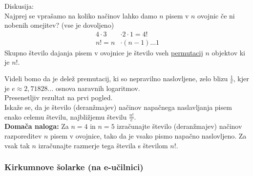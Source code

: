 \noindent
Diskusija: \\
Najprej se vprašamo na koliko načinov lahko damo $n$ pisem v $n$ ovojnic če ni nobenih omejitev? (vse je dovoljeno)
\begin{align*}
    4 \cdot 3 &\cdot 2 \cdot 1 = 4! \\
    n! = n &\cdot (n - 1) \dots 1
\end{align*}
Skupno število dajanja pisem v ovojnice je število vseh \underline{permutacij} $n$ objektov ki je $n!$.
\begin{center}
\end{center}
Videli bomo da je delež premutacij, ki so nepravilno naslovljene, zelo blizu $\frac{1}{e}$, kjer je $e \approx 2,71828\dots$ osnova naravnih logaritmov. \\

\noindent
Presenetljiv rezultat na prvi pogled. \\

\noindent
Iskaže se, da je število (deranžmajev) načinov napačnega naslavljanja pisem enako celemu številu, najbližjemu številu $\frac{n!}{e}$. \\

\noindent
\textbf{Domača naloga:} Za $n = 4$ in $n = 5$ izračunajte število (deranžmajev) načinov razporeditev $n$ pisem v ovojnice, tako da je vsako pismo napačno naslovljeno. Za vsak tak $n$ izračunajte razmerje tega števila s številom $n!$.

\subsubsection{Kirkumnove šolarke (na e-učilnici)}

